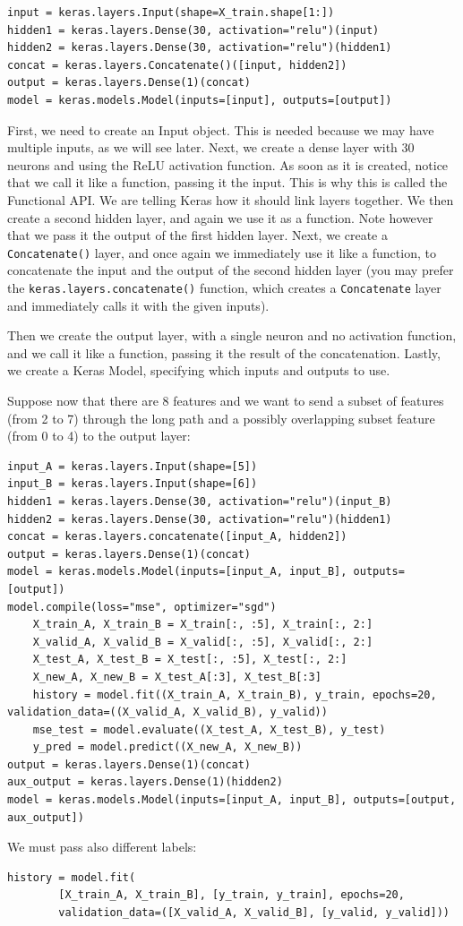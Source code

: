 \begin{lstlisting}
input = keras.layers.Input(shape=X_train.shape[1:])
hidden1 = keras.layers.Dense(30, activation="relu")(input)
hidden2 = keras.layers.Dense(30, activation="relu")(hidden1)
concat = keras.layers.Concatenate()([input, hidden2])
output = keras.layers.Dense(1)(concat)
model = keras.models.Model(inputs=[input], outputs=[output])
\end{lstlisting}

First, we need to create an Input object. This is needed because we may have multiple inputs, as we will see later. Next, we create a dense layer with 30 neurons and using the ReLU activation function. As soon as it is created, notice that we call it like a function, passing it the input. This is why this is called the Functional API. We are telling Keras how it should link layers together. We then create a second hidden layer, and again we use it as a function. Note however that we pass it the output of the first hidden layer. Next, we create a \lstinline+Concatenate()+ layer, and once again we immediately use it like a function, to concatenate the input and the output of the second hidden layer (you may prefer the \lstinline+keras.layers.concatenate()+ function, which creates a \lstinline+Concatenate+ layer and immediately calls it with the given inputs). 

Then we create the output layer, with a single neuron and no activation function, and we call it like a function, passing it the result of the concatenation. Lastly, we create a Keras Model, specifying which inputs and outputs to use.

Suppose now that there are 8 features and we want to send a subset of features (from 2 to 7) through the long path and a possibly overlapping subset feature (from 0 to 4) to the output layer:
\begin{lstlisting}
input_A = keras.layers.Input(shape=[5])
input_B = keras.layers.Input(shape=[6])
hidden1 = keras.layers.Dense(30, activation="relu")(input_B)
hidden2 = keras.layers.Dense(30, activation="relu")(hidden1)
concat = keras.layers.concatenate([input_A, hidden2])
output = keras.layers.Dense(1)(concat)
model = keras.models.Model(inputs=[input_A, input_B], outputs=[output])
model.compile(loss="mse", optimizer="sgd")
    X_train_A, X_train_B = X_train[:, :5], X_train[:, 2:]
    X_valid_A, X_valid_B = X_valid[:, :5], X_valid[:, 2:]
    X_test_A, X_test_B = X_test[:, :5], X_test[:, 2:]
    X_new_A, X_new_B = X_test_A[:3], X_test_B[:3]
    history = model.fit((X_train_A, X_train_B), y_train, epochs=20, validation_data=((X_valid_A, X_valid_B), y_valid))
    mse_test = model.evaluate((X_test_A, X_test_B), y_test)
    y_pred = model.predict((X_new_A, X_new_B))
output = keras.layers.Dense(1)(concat)
aux_output = keras.layers.Dense(1)(hidden2)
model = keras.models.Model(inputs=[input_A, input_B], outputs=[output, aux_output])
\end{lstlisting}
We must pass also different labels:
\begin{lstlisting}
history = model.fit(
        [X_train_A, X_train_B], [y_train, y_train], epochs=20,
        validation_data=([X_valid_A, X_valid_B], [y_valid, y_valid]))
\end{lstlisting}

